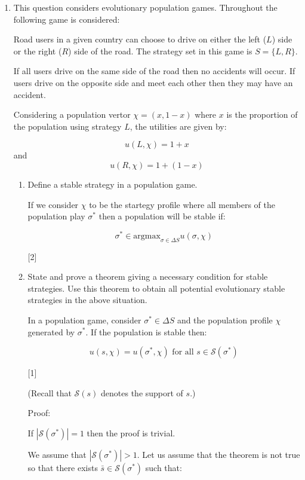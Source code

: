 \documentclass[12pt,a4paper]{article}
\begin{document}
\begin{enumerate}
\newpage
\item

    This question considers evolutionary population games.
    Throughout the following game is considered:

    Road users in a given country can choose to drive on either the left (\(L\)) side or the right (\(R\)) side of the road.
    The strategy set in this game is \(S=\{L, R\}\).

    If all users drive on the same side of the road then no accidents will occur.
    If users drive on the opposite side and meet each other then they may have an accident.

    Considering a population vertor \(\chi=(x,1-x)\) where \(x\) is the proportion of the population using strategy \(L\), the utilities are given by:

    \[u(L,\chi)=1+x\]
    and
    \[u(R,\chi)=1+(1-x)\]


    \begin{enumerate}

            \item Define a stable strategy in a population game.

                If we consider \(\chi\) to be the startegy profile where all members of the population play \(\sigma^*\) then a population will be stable if:

                $$\sigma^*\in\text{argmax}_{\sigma\in\Delta S}u(\sigma,\chi)$$

                \hfill{[2]}

            \item State and prove a theorem giving a necessary condition for stable strategies.
                Use this theorem to obtain all potential evolutionary stable strategies in the above situation.


        In a population game, consider \(\sigma^*\in\Delta S\) and the population profile \(\chi\) generated by \(\sigma^*\). If the population is stable then:

        $$u(s,\chi)=u(\sigma^*,\chi)\text{ for all }s\in\mathcal{S}(\sigma^*)$$

                \hfill{[1]}

        (Recall that \(\mathcal{S}(s)\) denotes the support of \(s\).)

        Proof:

        If \(|\mathcal{S}(\sigma^*)|=1\) then the proof is trivial.

        We assume that \(|\mathcal{S}(\sigma^*)|>1\). Let us assume that the theorem is not true so that there exists \(\bar s\in\mathcal{S}(\sigma^*)\) such that:


\end{enumerate}
\end{enumerate}
\end{document}
